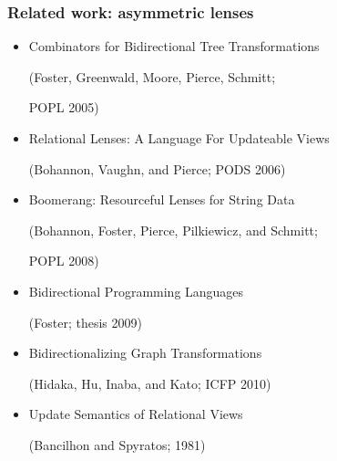 \documentclass[14pt]{beamer}
\begin{document}
\begin{frame}
    \frametitle{Related work: asymmetric lenses}
    \begin{itemize}
        \small
        \item Combinators for Bidirectional Tree Transformations

            \quad (Foster, Greenwald, Moore, Pierce, Schmitt;

            \quad POPL 2005)
        \item Relational Lenses: A Language For Updateable Views

            \quad (Bohannon, Vaughn, and Pierce; PODS 2006)
        \item Boomerang: Resourceful Lenses for String Data

            \quad (Bohannon, Foster, Pierce, Pilkiewicz, and Schmitt;

            \quad POPL 2008)

        \item Bidirectional Programming Languages

            \quad (Foster; thesis 2009)
        \item Bidirectionalizing Graph Transformations

            \quad (Hidaka, Hu, Inaba, and Kato; ICFP 2010)
        \item Update Semantics of Relational Views

            \quad (Bancilhon and Spyratos; 1981)
    \end{itemize}
\end{frame}

\end{document}
